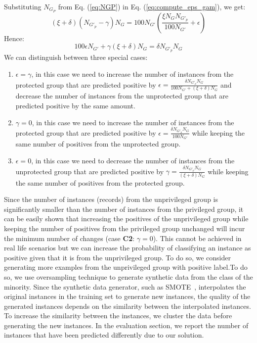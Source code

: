 Substituting $N_{G_P}$ from Eq. (\ref{eq:NGP}) in Eq. (\ref{eq:compute_eps_gam}), we get:
\[
\left(\xi + \delta\right)\left(N_{G'_p}-\gamma\right)N_{G} = 100 N_{G'} \left(\frac{\xi N_G N_{G'_p}}{100N_{G'}} + \epsilon\right) 
\]
Hence:
\[
100 \epsilon N_{G'} +\gamma \left(\xi + \delta\right) N_{G} = \delta N_{G'_p} N_G
\]
We can distinguish between three special cases:
\begin{enumerate}[label=\textbf{C\arabic*:}]
    \item $\epsilon = \gamma$, in this case we need to increase the number of instances from the protected group that are predicted positive by $\epsilon = \frac{\delta N_{G'_p} N_G}{100N_{G'}+\left(\xi+\delta\right)N_G}$ and decrease the number of instances from the unprotected group that are predicted positive by the same amount.
    \item $\gamma = 0$, in this case we need to increase the number of instances from the protected group that are predicted positive by $\epsilon = \frac{\delta N_{G'_p} N_G}{100N_{G'}}$ while keeping the same number of positives from the unprotected group.
    \item $\epsilon = 0$, in this case we need to decrease the number of instances from the unprotected group that are predicted positive by $\gamma = \frac{\delta N_{G'_p} N_G}{\left(\xi+\delta\right)N_G}$ while keeping the same number of positives from the protected group.
\end{enumerate}

Since the number of instances (records) from the unprivileged group is significantly smaller than the number of instances from the privileged group, it can be easily shown that increasing the positives of the unprivileged group while keeping the number of positives from the privileged group unchanged will incur the minimum number of changes (case {\bf C2}: $\gamma = 0$). This cannot be achieved in real life scenarios but we can increase the probability of classifying an instance as positive given that it is from the unprivileged group. 
To do so, we consider generating more examples from the  unprivileged group with positive label.To do so, we use oversampling technique to generate synthetic data from the class of the minority. Since the synthetic data generator, such as SMOTE~\cite{smote}, interpolates the original instances in the training set to generate new instances, the quality of the generated instances depends on the similarity between the interpolated instances. To increase the similarity between the instances, we cluster the data before generating the new instances. 
In the evaluation section, we report the number of instances that have been predicted differently due to our solution. 

